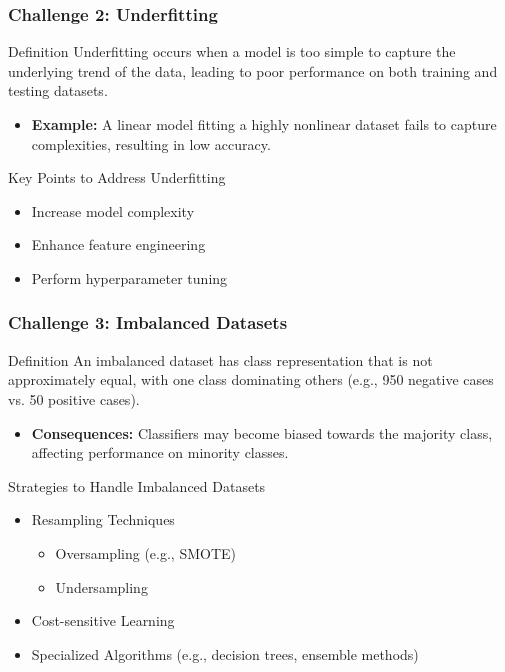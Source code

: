 \documentclass{beamer}
\begin{document}
\begin{frame}[fragile]
    \frametitle{Challenge 2: Underfitting}
    \begin{block}{Definition}
        Underfitting occurs when a model is too simple to capture the underlying trend of the data, leading to poor performance on both training and testing datasets.
    \end{block}
    \begin{itemize}
        \item \textbf{Example:} A linear model fitting a highly nonlinear dataset fails to capture complexities, resulting in low accuracy.
    \end{itemize}
    \begin{block}{Key Points to Address Underfitting}
        \begin{itemize}
            \item Increase model complexity
            \item Enhance feature engineering
            \item Perform hyperparameter tuning
        \end{itemize}
    \end{block}
\end{frame}

\begin{frame}[fragile]
    \frametitle{Challenge 3: Imbalanced Datasets}
    \begin{block}{Definition}
        An imbalanced dataset has class representation that is not approximately equal, with one class dominating others (e.g., 950 negative cases vs. 50 positive cases).
    \end{block}
    \begin{itemize}
        \item \textbf{Consequences:} Classifiers may become biased towards the majority class, affecting performance on minority classes.
    \end{itemize}
    \begin{block}{Strategies to Handle Imbalanced Datasets}
        \begin{itemize}
            \item Resampling Techniques
                \begin{itemize}
                    \item Oversampling (e.g., SMOTE)
                    \item Undersampling
                \end{itemize}
            \item Cost-sensitive Learning
            \item Specialized Algorithms (e.g., decision trees, ensemble methods)
        \end{itemize}
    \end{block}
\end{frame}
\end{document}

